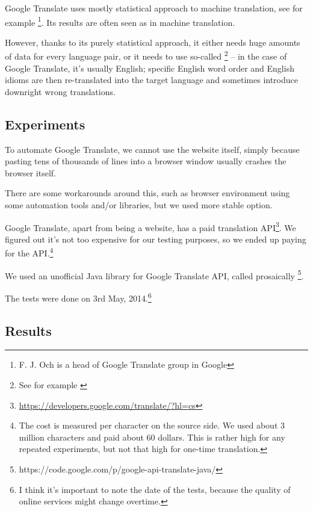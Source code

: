 Google Translate uses mostly statistical approach to machine translation, see for example \cite{och}\footnote{F. J. Och is a head of Google Translate group in Google}. Its results are often seen as  in machine translation.

However, thanks to its purely statistical approach, it either needs huge amounts of data for every language pair, or it needs to use so-called \footnote{See for example \cite{koehn2010statistical}} -- in the case of Google Translate, it's usually English; specific English word order and English idioms are then re-translated into the target language and sometimes introduce downright wrong translations.

\subsection{Experiments}
To automate Google Translate, we cannot use the website itself, simply because pasting tens of thousands of lines into a browser window usually crashes the browser itself.

There are some workarounds around this, such as  browser environment using some automation tools and/or libraries, but we used more stable option.

Google Translate, apart from being a website, has a paid translation API\footnote{\url{https://developers.google.com/translate/?hl=cs}}. We figured out it's not too expensive for our testing purposes, so we ended up paying for the API.\footnote{The cost is measured per character on the source side. We used about 3 million characters and paid about 60 dollars. This is rather high for any repeated experiments, but not that high for one-time translation.}

We used an unofficial Java library for Google Translate API, called prosaically \footnote{https://code.google.com/p/google-api-translate-java/}.

The tests were done on 3rd May, 2014.\footnote{I think it's important to note the date of the tests, because the quality of online services might change overtime.}

\subsection{Results}

